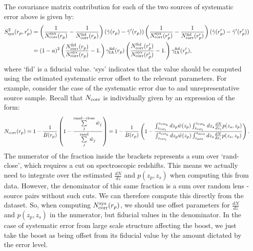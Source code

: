 \documentclass[onecolumn,amsmath,aps,fleqn, superscriptaddress]{revtex4}
\begin{document}
The covariance matrix contribution for each of the two sources of systematic error above is given by:
\begin{align}
S_{\rm sys}^2(r_p, r_p^\prime) &= \left(\frac{1}{N_{\rm corr}^{\rm sys}(r_p)} - \frac{1}{N_{\rm corr}^{\rm fid}(r_p)}\right)(\tilde{\gamma}(r_p) - \tilde{\gamma}^\prime(r_p))  \left(\frac{1}{N_{\rm corr}^{\rm sys}(r_p^\prime)} - \frac{1}{N_{\rm corr}^{\rm fid}(r_p^\prime)}\right)(\tilde{\gamma}(r_p^\prime) - \tilde{\gamma}^\prime(r_p^\prime)) \nonumber \\
& = (1-a)^2 \left(\frac{N_{\rm corr}^{\rm fid}(r_p)}{N_{\rm corr}^{\rm sys}(r_p)}-1.\right) \gamma_{\rm IA}^{\rm fid}(r_p) \left(\frac{N_{\rm corr}^{\rm fid}(r_p^\prime)}{N_{\rm corr}^{\rm sys}(r_p^\prime)}-1.\right)\gamma_{\rm IA}^{\rm fid}(r_p'),
\label{sys_general}
\end{align}
where `fid' is a fiducial value. `sys' indicates that the value should be computed using the estimated systematic error offset to the relevant parameters. For example, consider the case of the systematic error due to and unrepresentative source sample. Recall that $N_{\rm corr}$ is individually given by an expression of the form:
\begin{equation}
N_{\rm corr}(r_p) =  1 - \frac{1}{B(r_p)}\left(1 - \frac{\sum\limits_{j}^{\rm rand-close}\tilde{w}_j}{\sum\limits_{j}^{\rm rand} \tilde{w}_j} \right) = 1 - \frac{1}{B(r_p)}\left(1 - \frac{\int_{z_{\rm cut_l}}^{z_{\rm cut_h}} dz_p \tilde{w}(z_p) \int_{z_{\rm cut_l}}^{z_{\rm cut_h}} dz_s\frac{dN}{dz_s} p(z_s, z_p)}{\int_{z_{\rm cut_l}}^{z_{\rm cut_h}} dz_p  \tilde{w}(z_p) \int_{z_{\rm min}}^{z_{\rm max}} dz_s\frac{dN}{dz_s} p(z_s, z_p)} \right).
\label{ncorr_repeat}
\end{equation}
The numerator of the fraction inside the brackets represents a sum over `rand-close', which requires a cut on spectroscopic redshifts. This means we actually need to integrate over the estimated $\frac{dN}{dz}$ and $p(z_p, z_s)$ when computing this from data. However, the denominator of this same fraction is a sum over random lens - source pairs without such cuts. We can therefore compute this directly from the dataset. So, when computing $N_{\rm corr}^{\rm sys}(r_p)$, we should use offset parameters for $\frac{dN}{dz}$ and $p(z_p, z_s)$ in the numerator, but fiducial values in the denominator. In the case of systematic error from large scale structure affecting the boost, we just take the boost as being offset from its fiducial value by the amount dictated by the error level.
\end{document}
